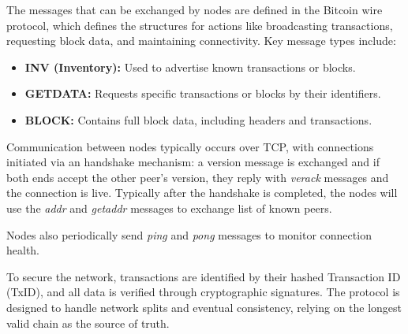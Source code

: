 The messages that can be exchanged by nodes are defined in the Bitcoin wire protocol, which defines the
structures for actions like broadcasting transactions, requesting block data, and maintaining connectivity.
Key message types include:
\begin{itemize}
  \item \textbf{INV (Inventory):} Used to advertise known transactions or blocks.
  \item \textbf{GETDATA:} Requests specific transactions or blocks by their identifiers.
  \item \textbf{BLOCK:} Contains full block data, including headers and transactions.
\end{itemize}

Communication between nodes typically occurs over TCP, with connections initiated via an handshake mechanism:
a version message is exchanged and if both ends accept the other peer's version, they reply with
\textit{verack} messages and the connection is live.
Typically after the handshake is completed, the nodes will use the \textit{addr} and
\textit{getaddr} messages to exchange list of known peers.

Nodes also periodically send \textit{ping} and
\textit{pong} messages to monitor connection health.

To secure the network, transactions are identified by their hashed Transaction ID (TxID), and all data is
verified through cryptographic signatures. The protocol is designed to handle network splits and eventual
consistency, relying on the longest valid chain as the source of truth.
